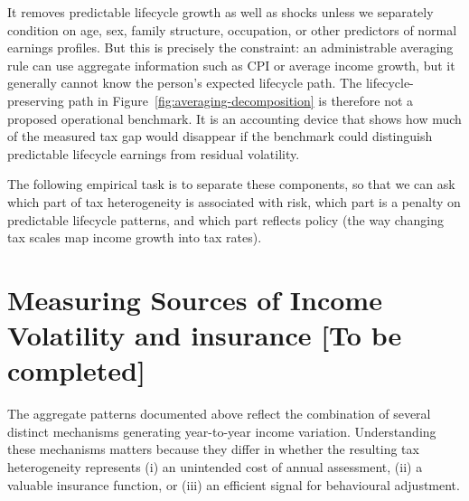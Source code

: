 \documentclass[12pt,a4paper]{article}
\begin{document}
It removes predictable lifecycle growth as well as shocks unless we separately condition on age, sex, family structure,
occupation, or other predictors of normal earnings profiles. But this is precisely the constraint: an administrable averaging rule can use aggregate information such as CPI or average income growth, but it generally cannot know the person's expected lifecycle path. The lifecycle-preserving path in Figure~\ref{fig:averaging-decomposition} is therefore not a proposed operational benchmark. It is an accounting device that shows how much of the measured tax gap would disappear if the benchmark could distinguish predictable lifecycle earnings from residual volatility.

The following empirical task is to separate these components, so that we can ask which part of tax heterogeneity is associated with risk, which part is a penalty on predictable lifecycle patterns, and which part reflects policy (the way changing tax scales map income growth into tax rates).


\section{Measuring Sources of Income Volatility and insurance [To be completed]}

The aggregate patterns documented above reflect the combination of several distinct mechanisms generating year-to-year income variation. Understanding these mechanisms matters because they differ in whether the resulting tax heterogeneity represents (i) an unintended cost of annual assessment, (ii) a valuable insurance function, or (iii) an efficient signal for behavioural adjustment.
\end{document}
